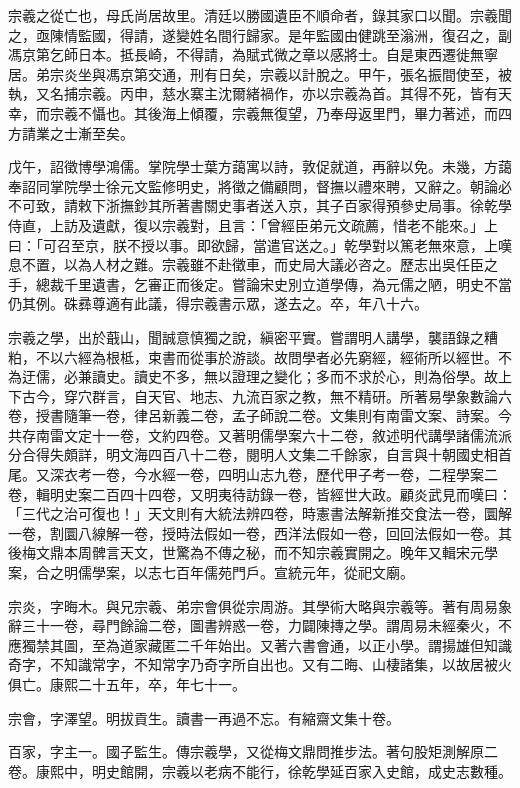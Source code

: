 \begin{pinyinscope}
宗羲之從亡也，母氏尚居故里。清廷以勝國遺臣不順命者，錄其家口以聞。宗羲聞之，亟陳情監國，得請，遂變姓名間行歸家。是年監國由健跳至滃洲，復召之，副馮京第乞師日本。抵長崎，不得請，為賦式微之章以感將士。自是東西遷徙無寧居。弟宗炎坐與馮京第交通，刑有日矣，宗羲以計脫之。甲午，張名振間使至，被執，又名捕宗羲。丙申，慈水寨主沈爾緒禍作，亦以宗羲為首。其得不死，皆有天幸，而宗羲不懾也。其後海上傾覆，宗羲無復望，乃奉母返里門，畢力著述，而四方請業之士漸至矣。

戊午，詔徵博學鴻儒。掌院學士葉方藹寓以詩，敦促就道，再辭以免。未幾，方藹奉詔同掌院學士徐元文監修明史，將徵之備顧問，督撫以禮來聘，又辭之。朝論必不可致，請敕下浙撫鈔其所著書關史事者送入京，其子百家得預參史局事。徐乾學侍直，上訪及遺獻，復以宗羲對，且言：「曾經臣弟元文疏薦，惜老不能來。」上曰：「可召至京，朕不授以事。即欲歸，當遣官送之。」乾學對以篤老無來意，上嘆息不置，以為人材之難。宗羲雖不赴徵車，而史局大議必咨之。歷志出吳任臣之手，總裁千里遺書，乞審正而後定。嘗論宋史別立道學傳，為元儒之陋，明史不當仍其例。硃彞尊適有此議，得宗羲書示眾，遂去之。卒，年八十六。

宗羲之學，出於蕺山，聞誠意慎獨之說，縝密平實。嘗謂明人講學，襲語錄之糟粕，不以六經為根柢，束書而從事於游談。故問學者必先窮經，經術所以經世。不為迂儒，必兼讀史。讀史不多，無以證理之變化；多而不求於心，則為俗學。故上下古今，穿穴群言，自天官、地志、九流百家之教，無不精研。所著易學象數論六卷，授書隨筆一卷，律呂新義二卷，孟子師說二卷。文集則有南雷文案、詩案。今共存南雷文定十一卷，文約四卷。又著明儒學案六十二卷，敘述明代講學諸儒流派分合得失頗詳，明文海四百八十二卷，閱明人文集二千餘家，自言與十朝國史相首尾。又深衣考一卷，今水經一卷，四明山志九卷，歷代甲子考一卷，二程學案二卷，輯明史案二百四十四卷，又明夷待訪錄一卷，皆經世大政。顧炎武見而嘆曰：「三代之治可復也！」天文則有大統法辨四卷，時憲書法解新推交食法一卷，圜解一卷，割圜八線解一卷，授時法假如一卷，西洋法假如一卷，回回法假如一卷。其後梅文鼎本周髀言天文，世驚為不傳之秘，而不知宗羲實開之。晚年又輯宋元學案，合之明儒學案，以志七百年儒苑門戶。宣統元年，從祀文廟。

宗炎，字晦木。與兄宗羲、弟宗會俱從宗周游。其學術大略與宗羲等。著有周易象辭三十一卷，尋門餘論二卷，圖書辨惑一卷，力闢陳摶之學。謂周易未經秦火，不應獨禁其圖，至為道家藏匿二千年始出。又著六書會通，以正小學。謂揚雄但知識奇字，不知識常字，不知常字乃奇字所自出也。又有二晦、山棲諸集，以故居被火俱亡。康熙二十五年，卒，年七十一。

宗會，字澤望。明拔貢生。讀書一再過不忘。有縮齋文集十卷。

百家，字主一。國子監生。傳宗羲學，又從梅文鼎問推步法。著句股矩測解原二卷。康熙中，明史館開，宗羲以老病不能行，徐乾學延百家入史館，成史志數種。


\end{pinyinscope}
